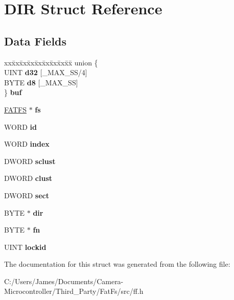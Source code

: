 \hypertarget{struct_d_i_r}{}\section{D\+IR Struct Reference}
\label{struct_d_i_r}
\subsection*{Data Fields}
\begin{DoxyCompactItemize}
\item 
\mbox{\label{struct_d_i_r_ade9b063a578fe4e0bdd144bb9e2070d8}} 
\begin{tabbing}
xx\=xx\=xx\=xx\=xx\=xx\=xx\=xx\=xx\=\kill
union \{\\
\>UINT {\bfseries d32} \mbox{[}\_MAX\_SS/4\mbox{]}\\
\>BYTE {\bfseries d8} \mbox{[}\_MAX\_SS\mbox{]}\\
\} {\bfseries buf}\\

\end{tabbing}\item 
\mbox{\label{struct_d_i_r_ae363a794e38f3a9aa1d55b8e3c7fcee7}} 
\hyperlink{struct_f_a_t_f_s}{F\+A\+T\+FS} $\ast$ {\bfseries fs}
\item 
\mbox{\label{struct_d_i_r_a7b7a6396b2c82ad46c6d8b2bf141a8dd}} 
W\+O\+RD {\bfseries id}
\item 
\mbox{\label{struct_d_i_r_ab7c5089b70ce76bcd61abe615ed2a42b}} 
W\+O\+RD {\bfseries index}
\item 
\mbox{\label{struct_d_i_r_ad5d52f3fde971d2a05ff777a6243c252}} 
D\+W\+O\+RD {\bfseries sclust}
\item 
\mbox{\label{struct_d_i_r_ac134c1b4645be670eb5207032e714616}} 
D\+W\+O\+RD {\bfseries clust}
\item 
\mbox{\label{struct_d_i_r_a3e49e0860170e0fd9fc3e891b0d59975}} 
D\+W\+O\+RD {\bfseries sect}
\item 
\mbox{\label{struct_d_i_r_a30fe34a14a6efb4c9c04a522f6cf3378}} 
B\+Y\+TE $\ast$ {\bfseries dir}
\item 
\mbox{\label{struct_d_i_r_a34e961714af3bc25c08d5832cca23204}} 
B\+Y\+TE $\ast$ {\bfseries fn}
\item 
\mbox{\label{struct_d_i_r_a1a3f468bbdddeae5d029fa73d512b0df}} 
U\+I\+NT {\bfseries lockid}
\end{DoxyCompactItemize}


The documentation for this struct was generated from the following file\+:\begin{DoxyCompactItemize}
\item 
C\+:/\+Users/\+James/\+Documents/\+Camera-\/\+Microcontroller/\+Third\+\_\+\+Party/\+Fat\+Fs/src/ff.\+h\end{DoxyCompactItemize}
